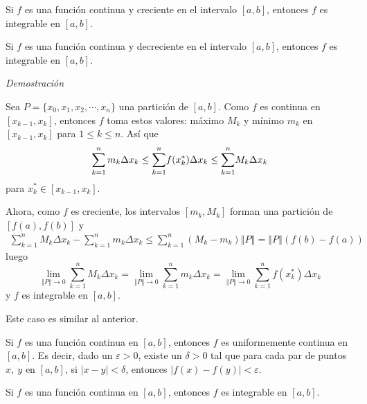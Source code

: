 \begin{teorema}\leavevmode
\begin{parrafonumerado}
\item Si $f$ es una función continua y creciente en el intervalo $[a,b]$, entonces $f$ es integrable en $[a,b].$
\item Si $f$ es una función continua y decreciente en el intervalo $[a,b]$, entonces $f$ es integrable en $[a,b].$
\end{parrafonumerado}
\end{teorema}

\textit{Demostración}

\begin{parrafonumerado}
\item Sea $P=\{x_{0},x_{1},x_{2},\cdots ,x_{n}\}$ una partición de $[a,b].$ Como $f$ es continua en $[x_{k-1},x_{k}]$, entonces $f$ toma estos valores: máximo $M_{k}$ y mínimo $m_{k}$ en $[x_{k-1},x_{k}]$ para $1\leq k\leq n$. Así que
\[
\sum_{k=1}^{n}m_{k}\Delta x_{k}\leq \overset{n}{%
\underset{k=1}{\sum }}f(x_{k}^{\ast })\Delta x_{k}\leq \overset{n}{%
\underset{k=1}{\sum }}M_{k}\Delta x_{k}
\]
para $x_{k}^{\ast }\in [x_{k-1},x_{k}]$.

Ahora, como $f$ es creciente, los intervalos $[m_{k},M_{k}]$ forman una
partición de $[f(a),f(b)]$ y
\begin{gather*}
\sum_{k=1}^{n}M_{k}\Delta x_{k}-\sum_{k=1}^{n}m_{k}\Delta x_{k}\leq \sum_{k=1}^{n}\left( M_{k}-m_{k}\right) \left\Vert P\right\Vert =\left\Vert P\right\Vert
(f(b)-f(a))
\end{gather*}
luego
\[
\underset{\left\Vert P\right\Vert \rightarrow 0}{\lim }\sum_{k=1}^{n}M_{k}\Delta x_{k}=\underset{\left\Vert P\right\Vert\rightarrow 0}{\lim }\sum_{k=1}^{n}m_{k}\Delta x_{k}=\underset{\left\Vert P\right\Vert \rightarrow 0}{\lim }\sum_{k=1}^{n}f(x_{k}^{\ast })\Delta x_{k}
\]
y $f$ es integrable en $[a,b]$.

\item Este caso es similar al anterior.
\end{parrafonumerado}

\begin{teorema}\leavevmode
\begin{parrafonumerado}
\item Si $f$ es una función continua en $[a,b]$, entonces $f$ es uniformemente continua en $[a,b]$. Es decir, dado un $\varepsilon >0$, existe un $\delta >0$ tal que para cada par de puntos $x,\ y$ en $[a,b]$, si $\left\vert x-y\right\vert <\delta$, entonces $\left\vert f\left( x\right)-f\left( y\right) \right\vert <\varepsilon$.

\item Si $f$ es una función continua en $[a,b]$, entonces $f$ es integrable en $[a,b]$.
\end{parrafonumerado}
\end{teorema}

